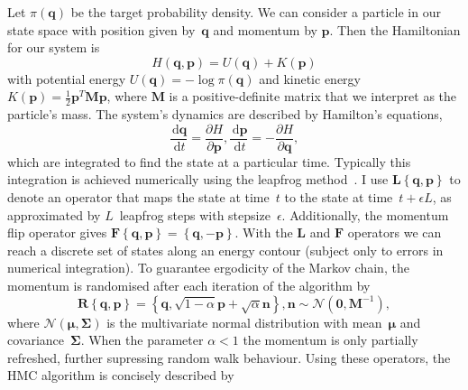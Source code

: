 \documentclass{article}
\newcommand{\dd}{\, \mathrm{d}}
\renewcommand{\vec}[1]{\ensuremath{\boldsymbol{\mathbf{#1}}}}
\newcommand{\mat}[1]{\ensuremath{\boldsymbol{\mathbf{#1}}}}
\newcommand{\op}[1]{\ensuremath{\boldsymbol{\mathbf{#1}}}}
\newcommand{\norm}[1]{\ensuremath{\mathcal{N}\left(#1\right)}}
\begin{document}
    Let $\pi\left(\vec{q}\right)$ be the target probability density.
    We can consider a particle in our state space with position given
        by~$\vec{q}$ and momentum by $\vec{p}$.
    Then the Hamiltonian for our system is
        \begin{equation}
            H\left(\vec{q},\vec{p}\right)
            = U\left(\vec{q}\right) + K\left(\vec{p}\right)
        \end{equation}
        with potential energy
        $U\left(\vec{q}\right) = -\log{\pi\left(\vec{q}\right)}$ and kinetic
        energy $K\left(\vec{p}\right) = \frac{1}{2} \vec{p}^T \mat{M} \vec{p}$,
        where $\mat{M}$ is a positive-definite matrix that we interpret as
        the particle's mass.
    The system's dynamics are described by Hamilton's equations,
        \begin{equation}
            \frac{\dd \vec{q}}{\dd t} = \frac{\partial H}{\partial \vec{p}},
            \frac{\dd \vec{p}}{\dd t} = -\frac{\partial H}{\partial \vec{q}},
        \end{equation}
        which are integrated to find the state at a particular time.
    Typically this integration is achieved numerically using the leapfrog
        method~\cite{Nea11}.
    I use $\op{L}\left\{\vec{q},\vec{p}\right\}$ to denote an operator that
        maps the state at time~$t$ to the state at time~$t + \epsilon L$, as
        approximated by $L$~leapfrog steps with stepsize~$\epsilon$.
    Additionally, the momentum flip operator gives
        $\op{F}\left\{\vec{q},\vec{p}\right\}
         = \left\{\vec{q},-\vec{p}\right\}$.
    With the $\op{L}$ and $\op{F}$ operators we can reach a discrete set of
        states along an energy contour (subject only to errors in numerical
        integration).
    To guarantee ergodicity of the Markov chain, the momentum is randomised
        after each iteration of the algorithm by
        \begin{equation}
            \op{R}\left\{\vec{q},\vec{p}\right\} =
            \left\{\vec{q}, \sqrt{1-\alpha}\vec{p} + \sqrt{\alpha}\vec{n}\right\},
            \vec{n} \sim \norm{\vec{0}, \mat{M}^{-1}},
        \end{equation}
        where $\norm{\vec{\mu},\mat{\Sigma}}$ is the multivariate
        normal distribution with mean~$\vec{\mu}$ and covariance~$\mat{\Sigma}$.
    When the parameter $\alpha < 1$ the momentum is only partially refreshed,
        further supressing random walk behaviour.
    Using these operators, the \ac{HMC} algorithm is concisely described by
\end{document}
